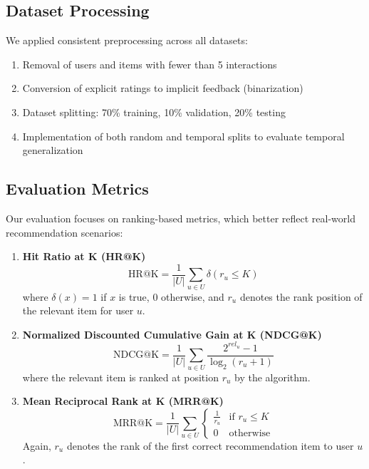 \documentclass[sigconf,nonacm]{acmart} %
\begin{document}
\subsection{Dataset Processing}
We applied consistent preprocessing across all datasets:
\begin{enumerate}
    \item Removal of users and items with fewer than 5 interactions
    \item Conversion of explicit ratings to implicit feedback (binarization)
    \item Dataset splitting: 70\% training, 10\% validation, 20\% testing
    \item Implementation of both random and temporal splits to evaluate temporal generalization
\end{enumerate}

\subsection{Evaluation Metrics}  
Our evaluation focuses on ranking-based metrics, which better reflect real-world recommendation scenarios:  

\begin{enumerate}  
    \item \textbf{Hit Ratio at K (HR@K)}  
    \begin{equation}  
    \text{HR@K} = \frac{1}{|U|}\sum_{u \in U} \delta(r_u \leq K)  
    \label{eq:hr}  
    \end{equation}  
    where $\delta(x) = 1$ if $x$ is true, $0$ otherwise, and $r_u$ denotes the rank position of the relevant item for user $u$.  
    
    \item \textbf{Normalized Discounted Cumulative Gain at K (NDCG@K)}  
    \begin{equation}  
    \text{NDCG@K} = \frac{1}{|U|}\sum_{u \in U}\frac{2^{rel_u} - 1}{\log_2(r_u + 1)}  
    \label{eq:ndcg}  
    \end{equation}  
    where the relevant item is ranked at position $r_u$ by the algorithm.  
    
    \item \textbf{Mean Reciprocal Rank at K (MRR@K)}  
    \begin{equation}  
    \text{MRR@K} = \frac{1}{|U|} \sum_{u \in U} \begin{cases}   
    \frac{1}{r_u} & \text{if } r_u \leq K \\
    0 & \text{otherwise}  
    \end{cases}  
    \label{eq:mrr}  
    \end{equation}  
    Again, $r_u$ denotes the rank of the first correct recommendation item to user $u$.  
\end{enumerate}  
\end{document}
